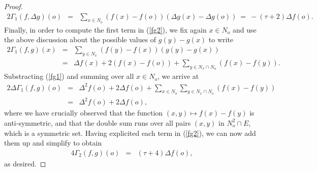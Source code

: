 \documentclass[12pt,final]{article}
\begin{document}
\begin{proof}
\begin{eqnarray}
2\Gamma_1(f,\Delta g)(o) & = & \sum_{x\in N_o}\left(f(x)-f(o)\right)\left(\Delta g(x)-\Delta g(o)\right) \ = \ -(\tau+2)\Delta f(o).
\end{eqnarray}
Finally, in order to compute the first term in (\ref{fg2}), we fix again $x\in N_o$ and use the above discussion about the possible values of $g(y)-g(x)$ to write 
\begin{eqnarray*}
2\Gamma_1(f,g)(x) & = & \sum_{y\in N_x}\left(f(y)-f(x)\right)\left(g(y)-g(x)\right)\\
 & = & \Delta f(x)+2\left(f(x)-f(o)\right)+\sum_{y\in N_x\cap N_o}\left(f(x)-f(y)\right).
\end{eqnarray*}
Substracting (\ref{fg1}) and summing over all $x\in N_o$, we arrive at
 \begin{eqnarray*}
2\Delta\Gamma_1(f,g)(o) 
& = & \Delta^2f(o)+2\Delta f(o)+\sum_{x\in N_o}\sum_{y\in N_x\cap N_o}\left(f(x)-f(y)\right)\\
& = & \Delta^2f(o)+2\Delta f(o),
\end{eqnarray*}
where we have crucially observed that the function $(x,y)\mapsto f(x)-f(y)$  is anti-symmetric, and that the double sum runs over all pairs $(x,y)$ in $N_o^2\cap E$, which is a symmetric set. Having explicited each term in (\ref{fg2}), we can now add them up and simplify to obtain
\begin{eqnarray}
4\Gamma_2(f,g)(o) 
& = & (\tau+4)\Delta f(o),
\end{eqnarray}
as desired. 
\end{proof}
\end{document}
